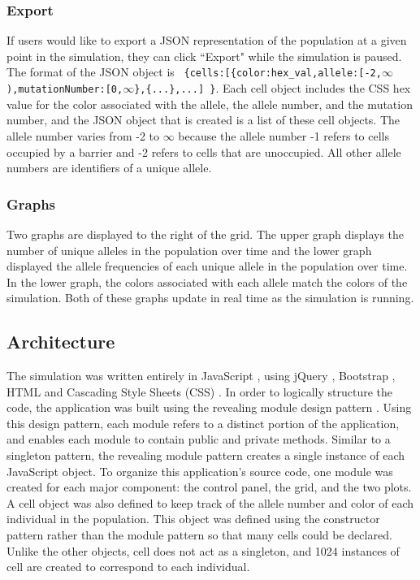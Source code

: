 \documentclass[12pt]{article}
\begin{document}
\begin{spacing}{1.6}
\subsubsection{Export}
If users would like to export a JSON representation of the population at a given point in the simulation, they can click ``Export" while the simulation is paused. The format of the JSON object is \ \texttt{\{cells:[\{color:hex\_val,allele:[-2,$\infty$),mutationNumber:[0,$\infty$\},\{...\},...] \}}. Each cell object includes the CSS hex value for the color associated with the allele, the allele number, and the mutation number, and the JSON object that is created is a list of these cell objects. The allele number varies from -2 to $\infty$ because the allele number -1 refers to cells occupied by a barrier and -2 refers to cells that are unoccupied. All other allele numbers are identifiers of a unique allele.

\subsubsection{Graphs}
Two graphs are displayed to the right of the grid. The upper graph displays the number of unique alleles in the population over time and the lower graph displayed the allele frequencies of each unique allele in the population over time. In the lower graph, the colors associated with each allele match the colors of the simulation. Both of these graphs update in real time as the simulation is running.

\subsection{Architecture}
The simulation was written entirely in JavaScript \cite{jsTutorial}, using jQuery \cite{jQuery}, Bootstrap \cite{bootstrap}, HTML \cite{htmlTutorial} and Cascading Style Sheets (CSS) \cite{cssTutorial}. In order to logically structure the code, the application was built using the revealing module design pattern \cite{js}. Using this design pattern, each module refers to a distinct portion of the application, and enables each module to contain public and private methods. Similar to a singleton pattern, the revealing module pattern creates a single instance of each JavaScript object. To organize this application's source code, one module was created for each major component: the control panel, the grid, and the two plots. A cell object was also defined to keep track of the allele number and color of each individual in the population. This object was defined using the constructor pattern \cite{js} rather than the module pattern so that many cells could be declared. Unlike the other objects, cell does not act as a singleton, and 1024 instances of cell are created to correspond to each individual.


\end{spacing}
\end{document}

